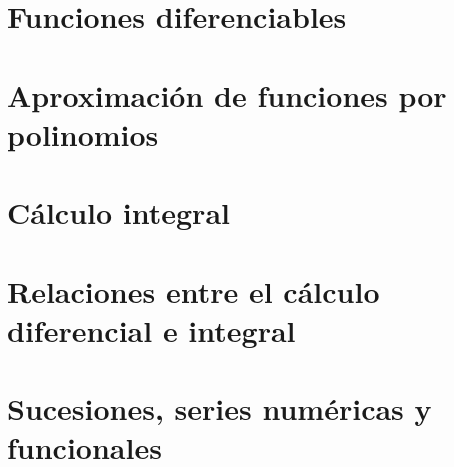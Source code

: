 \chapter{Funciones diferenciables}

\chapter{Aproximación de funciones por polinomios}


\chapter{Cálculo integral}

\chapter{Relaciones entre el cálculo diferencial e integral}

\chapter{Sucesiones, series numéricas y funcionales}



